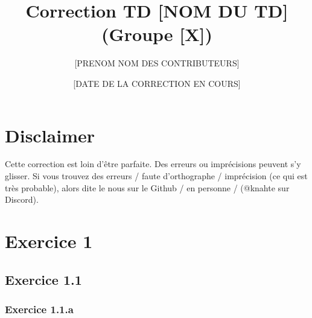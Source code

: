 \documentclass[a4paper,12pt]{article}
\title{\textbf{Correction TD [NOM DU TD] (Groupe [X])}}
\author{[PRENOM NOM DES CONTRIBUTEURS]}
\date{[DATE DE LA CORRECTION EN COURS]}
\begin{document}
\maketitle
\thispagestyle{fancy}
\section*{Disclaimer}
Cette correction est loin d'être parfaite. Des erreurs ou imprécisions peuvent s'y glisser. Si vous trouvez des erreurs / faute d’orthographe / imprécision (ce qui est très probable), alors dite le nous sur le Github / en personne / (@knahte sur Discord).
\tableofcontents
\newpage

\section{Exercice 1}
\subsection{Exercice 1.1}
\subsubsection{Exercice 1.1.a}
\end{document}
